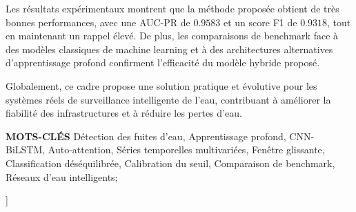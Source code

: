 {\begin{leftbar}
Les résultats expérimentaux montrent que la méthode proposée obtient de très
bonnes performances, avec une AUC-PR de $0.9583$ et un score F1 de $0.9318$,
tout en maintenant un rappel élevé. De plus, les comparaisons de benchmark face
à des modèles classiques de machine learning et à des architectures alternatives
d'apprentissage profond confirment l'efficacité du modèle hybride proposé.

Globalement, ce cadre propose une solution pratique et évolutive pour les
systèmes réels de surveillance intelligente de l'eau, contribuant à améliorer la
fiabilité des infrastructures et à réduire les pertes d'eau.
\end{leftbar}

\vspace{1em}

\begin{leftbar}
\textbf{\textcolor{headingblue}{MOTS-CLÉS}} Détection des fuites d'eau,
Apprentissage profond, CNN-BiLSTM, Auto-attention,
Séries temporelles multivariées, Fenêtre glissante,
Classification déséquilibrée, Calibration du seuil,
Comparaison de benchmark, Réseaux d'eau intelligents;
\end{leftbar}

\vspace{2.5em}
}]